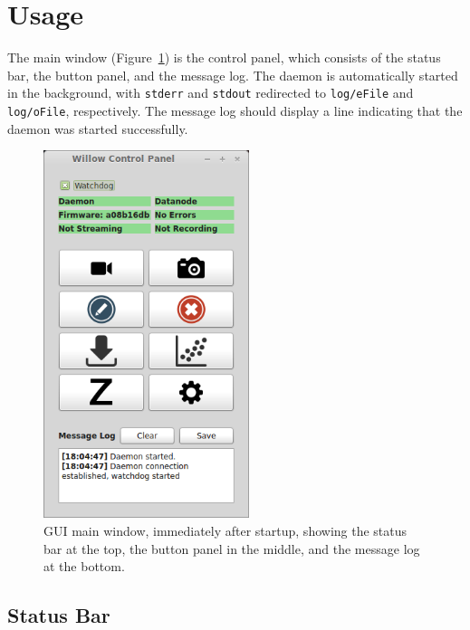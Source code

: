 
\section{Usage}
\label{sec_usage}

The main window (Figure~\ref{fig_mainwindow}) is the control panel, which consists of the status bar, the button panel, and the message log. The daemon is automatically started in the background, with \texttt{stderr} and \texttt{stdout} redirected to \texttt{log/eFile} and \texttt{log/oFile}, respectively. The message log should display a line indicating that the daemon was started successfully.

\begin{figure}[h!]
\begin{center}
\includegraphics[width=6cm]{screenshots/mainwindow.png}
\end{center}
\caption{GUI main window, immediately after startup, showing the status bar at the top, the button panel in the middle, and the message log at the bottom.}
\label{fig_mainwindow}
\end{figure}



\subsection{Status Bar}
\label{sec_usage_statusbar}

